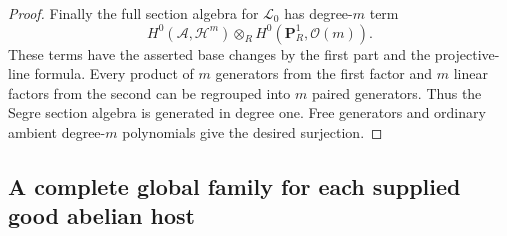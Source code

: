 \begin{proof}
Finally the full section algebra for $\mathcal L_0$
has degree-$m$ term
\[
 H^0(\mathcal A,\mathcal H^m)\otimes_R
                         H^0(\mathbf P^1_R,\mathcal O(m)).
 \tag{AS22.5}\label{r22as:Segre}
\]
These terms have the asserted base changes by the
first part and the projective-line formula.
Every product of $m$ generators from the first
factor and $m$ linear factors from the second
can be regrouped into $m$ paired generators.
Thus the Segre section algebra is generated in
degree one.  Free generators and ordinary ambient
degree-$m$ polynomials give the desired surjection.
\end{proof}

\subsection{A complete global family for each supplied good abelian host}

